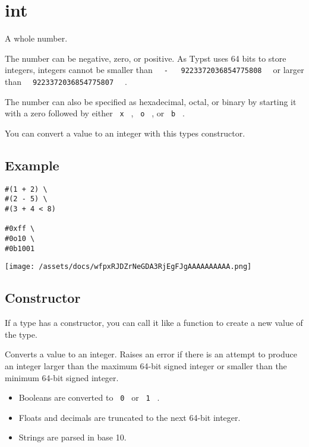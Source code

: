 \section{\texorpdfstring{{ int }}{ int }}\label{summary}

A whole number.

The number can be negative, zero, or positive. As Typst uses 64 bits to
store integers, integers cannot be smaller than
\texttt{\ }{\texttt{\ -\ }}\texttt{\ }{\texttt{\ 9223372036854775808\ }}\texttt{\ }
or larger than \texttt{\ }{\texttt{\ 9223372036854775807\ }}\texttt{\ }
.

The number can also be specified as hexadecimal, octal, or binary by
starting it with a zero followed by either \texttt{\ x\ } ,
\texttt{\ o\ } , or \texttt{\ b\ } .

You can convert a value to an integer with this type\textquotesingle s
constructor.

\subsection{Example}\label{example}

\begin{verbatim}
#(1 + 2) \
#(2 - 5) \
#(3 + 4 < 8)

#0xff \
#0o10 \
#0b1001
\end{verbatim}

\texttt{[image: /assets/docs/wfpxRJDZrNeGDA3RjEgFJgAAAAAAAAAA.png]}

\subsection{\texorpdfstring{Constructor
{}}{Constructor }}\label{constructor}

\label{constructor-constructor-tooltip}
If a type has a constructor, you can call it like a function to create a
new value of the type.

Converts a value to an integer. Raises an error if there is an attempt
to produce an integer larger than the maximum 64-bit signed integer or
smaller than the minimum 64-bit signed integer.

\begin{itemize}
\tightlist
\item
  Booleans are converted to \texttt{\ 0\ } or \texttt{\ 1\ } .
\item
  Floats and decimals are truncated to the next 64-bit integer.
\item
  Strings are parsed in base 10.
\end{itemize}

